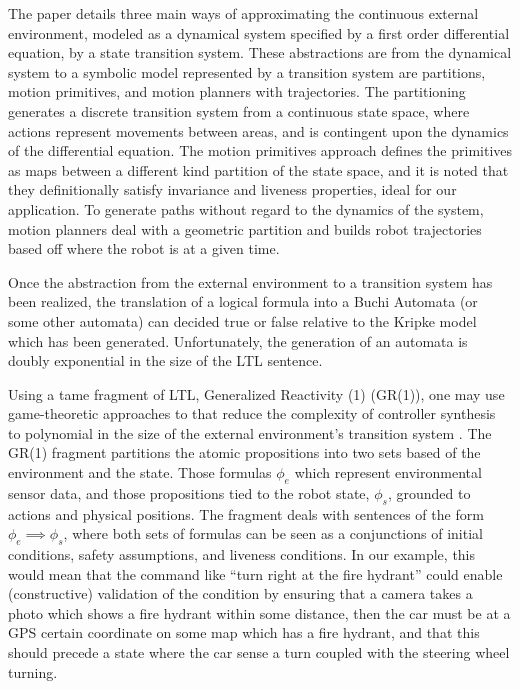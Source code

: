 \documentclass{article}
\begin{document}
The paper details three main ways of approximating the continuous external
environment, modeled as a dynamical system specified by a first order
differential equation, by a state transition system. These abstractions are from
the dynamical system to a symbolic model represented by a transition system are
partitions, motion primitives, and motion planners with trajectories. The partitioning generates a
discrete transition system from a continuous state space, where actions
represent movements between areas, and is contingent upon the dynamics of the
differential equation. The motion primitives approach defines the primitives as
maps between a different kind partition of the state space, and it is noted that
they definitionally satisfy invariance and liveness properties, ideal for our application.
To generate paths without regard to the dynamics of the system, motion planners
deal with a geometric partition and builds robot trajectories based off where
the robot is at a given time.

Once the abstraction from the external environment to a transition system has
been realized, the translation of a logical formula into a Buchi Automata (or
some other automata) can decided true or false relative to the Kripke model
which has been generated. Unfortunately, the generation of an automata is doubly
exponential in the size of the LTL sentence.

Using a tame fragment of LTL, Generalized Reactivity (1) (GR(1)), one may use
game-theoretic approaches to that reduce the complexity of controller synthesis
to polynomial in the size of the external environment's transition system
\cite{BLOEM2012911}. The GR(1) fragment partitions the atomic propositions into
two sets based of the environment and the state. Those formulas $\phi_e$ which
represent environmental sensor data, and those propositions tied to the robot
state, $\phi_s$, grounded to actions and physical positions. The fragment deals
with sentences of the form $\phi_e \implies \phi_s$, where both sets of formulas
can be seen as a conjunctions of initial conditions, safety assumptions, and
liveness conditions. In our example, this would mean that the command like
``turn right at the fire hydrant'' could enable (constructive) validation of the
condition by ensuring that a camera takes a photo which shows a fire hydrant
within some distance, then the car must be at a GPS certain coordinate on some
map which has a fire hydrant, and that this should precede a state where the car
sense a turn coupled with the steering wheel turning.
\end{document}
